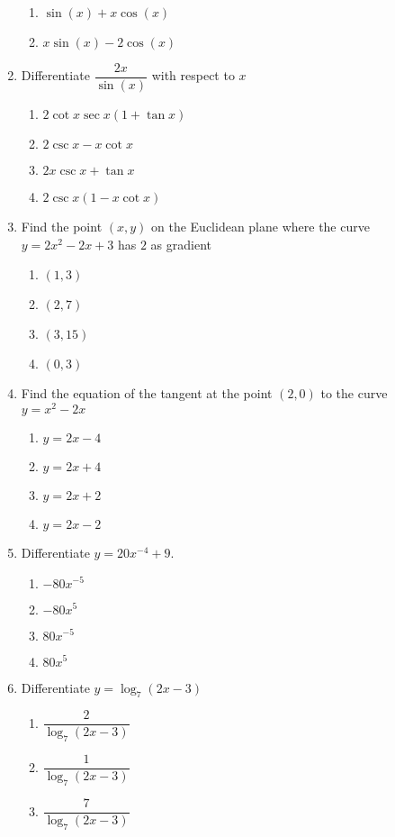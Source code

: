 \begin{multicols}{2}
\begin{enumerate}[label={\arabic*.}]
\begin{enumerate}[label={\Alph*.}]
\item \(\sin(x) + x \cos(x)\)
\item \(x\sin(x)- 2 \cos(x)\)
\end{enumerate}
\item Differentiate \(\dfrac{2x}{\sin(x)}\) with respect to \(x\)
\begin{enumerate}[label={\Alph*.}]
\item \(2\cot{x}\sec{x}(1 + \tan{x})\)
\item \(2\csc{x} - x{\cot{x}}\)
\item \(2x\csc{x} + \tan{x}\)
\item \(2\csc{x}(1 - x{\cot{x}})\)
\end{enumerate}
\item Find the point \((x, y)\) on the Euclidean plane where the curve \(y = 2{x}^{2} - 2x + 3\) has \(2\) as gradient
\begin{enumerate}[label={\Alph*.}]
\item \((1, 3)\)
\item \((2, 7)\)
\item \((3, 15)\)
\item \((0, 3)\)
\end{enumerate}
\item Find the equation of the tangent at the point \((2, 0)\) to the curve \(y = {x}^{2} - 2x\)
\begin{enumerate}[label={\Alph*.}]
\item \(y = 2x - 4\)
\item \(y = 2x + 4\)
\item \(y = 2x + 2\)
\item \(y = 2x - 2\)
\end{enumerate}
\item Differentiate \(y = 20{x}^{-4} + 9\).
\begin{enumerate}[label={\Alph*.}]
\item \(-80{x}^{-5}\)
\item \(-80{x}^{5}\)
\item \(80{x}^{-5}\)
\item \(80{x}^{5}\)
\end{enumerate}
\item Differentiate \(y = \log_{7}{(2x - 3)}\)   
\begin{enumerate}[label={\Alph*.}]
\item \(\dfrac{2}{\log_{7}{(2x - 3)}}\)
\item \(\dfrac{1}{\log_{7}{(2x - 3)}}\)
\item \(\dfrac{7}{\log_{7}{(2x - 3)}}\)

\end{enumerate}
\end{enumerate}
\end{multicols}
